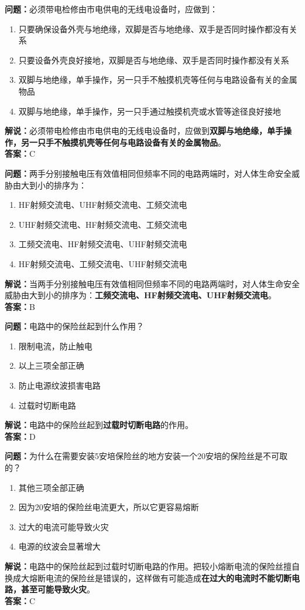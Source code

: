 \textbf{问题：}必须带电检修由市电供电的无线电设备时，应做到：
\begin{enumerate}[label=\Alph*), leftmargin=1.5cm]
	\item 只要确保设备外壳与地绝缘，双脚是否与地绝缘、双手是否同时操作都没有关系
	\item 只要设备外壳良好接地，双脚是否与地绝缘、双手是否同时操作都没有关系
	\item 双脚与地绝缘，单手操作，另一只手不触摸机壳等任何与电路设备有关的金属物品
	\item 双脚与地绝缘，单手操作，另一只手通过触摸机壳或水管等途径良好接地
\end{enumerate}
\textbf{解说：}必须带电检修由市电供电的无线电设备时，应做到\textbf{双脚与地绝缘，单手操作，另一只手不触摸机壳等任何与电路设备有关的金属物品}。\\\textbf{答案：}C

\textbf{问题：}两手分别接触电压有效值相同但频率不同的电路两端时，对人体生命安全威胁由大到小的排序为：
\begin{enumerate}[label=\Alph*), leftmargin=1.5cm]
	\item HF射频交流电、UHF射频交流电、工频交流电
	\item UHF射频交流电、HF射频交流电、工频交流电
	\item 工频交流电、HF射频交流电、UHF射频交流电
	\item HF射频交流电、工频交流电、UHF射频交流电
\end{enumerate}
\textbf{解说：}当两手分别接触电压有效值相同但频率不同的电路两端时，对人体生命安全威胁由大到小的排序为：\textbf{工频交流电、HF射频交流电、UHF射频交流电}。\\\textbf{答案：}B%


\textbf{问题：}电路中的保险丝起到什么作用？
\begin{enumerate}[label=\Alph*), leftmargin=1.5cm]
	\item 限制电流，防止触电
	\item 以上三项全部正确
	\item 防止电源纹波损害电路
	\item 过载时切断电路
\end{enumerate}
\textbf{解说：}电路中的保险丝起到\textbf{过载时切断电路}的作用。\\\textbf{答案：}D

\textbf{问题：}为什么在需要安装5安培保险丝的地方安装一个20安培的保险丝是不可取的？
\begin{enumerate}[label=\Alph*), leftmargin=1.5cm]
	\item 其他三项全部正确
	\item 因为20安培的保险丝电流更大，所以它更容易熔断
	\item 过大的电流可能导致火灾
	\item 电源的纹波会显著增大
\end{enumerate}
\textbf{解说：}电路中的保险丝起到过载时切断电路的作用。把较小熔断电流的保险丝擅自换成大熔断电流的保险丝是错误的，这样做有可能造成\textbf{在过大的电流时不能切断电路，甚至可能导致火灾}。\\\textbf{答案：}C%



